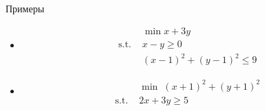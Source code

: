 \documentclass[12pt]{beamer}
\begin{document}
\begin{frame}{Примеры}
\begin{itemize}
\item 
\begin{equation*}
\begin{split}
& \min x + 3y\\
\text{s.t. } & x - y \geq 0\\
& (x - 1)^2 + (y - 1)^2 \leq 9
\end{split}
\end{equation*}
\item 
\begin{equation*}
\begin{split}
& \min \; (x+ 1)^2 + (y + 1)^2\\
\text{s.t. } & 2x + 3y \geq 5
\end{split}
\end{equation*}

\end{itemize}
\end{frame}
\end{document}
